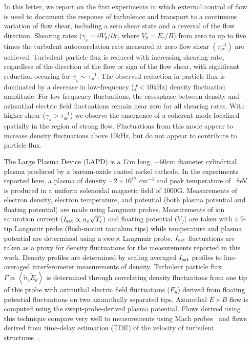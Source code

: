 \documentclass[aps,prl,amsmath,amssymb,preprint,superscriptaddress]{revtex4} %
\begin{document}
In this letter, we report on the first experiments in which external control of flow is used to document the response of turbulence and transport to a continuous variation of flow shear, including a zero shear state and a reversal of the flow direction. Shearing rates ($\gamma_{s}= \partial V_{\theta}/\partial r$, where $V_{\theta} = E_r/B$) from zero to up to five times the turbulent autocorrelation rate measured at zero flow shear $(\tau_{ac}^{-1})$ are achieved. Turbulent particle flux is reduced with increasing shearing rate, regardless of the direction of the flow or sign of the flow shear, with significant reduction occuring for $\gamma_{s} \sim \tau_{ac}^{-1}$.  The observed reduction in particle flux is dominated by a decrease in low-frequency ($f < 10$kHz) density fluctuation amplitude. For low frequency fluctuations, the crossphase between density and azimuthal electric field fluctuations remain near zero for all shearing rates.  With higher shear ($\gamma_{s} > \tau_{ac}^{-1}$) we observe the emergence of a coherent mode localized spatially in the region of strong flow. Fluctuations from this mode appear to increase density fluctuations above 10kHz, but do not appear to contribute to particle flux.   

The Large Plasma Device \cite{gek91} (LAPD) is a 17m long, $\sim$60cm diameter cylindrical plasma produced by a barium-oxide coated nickel
cathode. In the experiments reported here, a plasma of density $\sim$$2 \times 10^{12}$ cm$^{-3}$ and peak temperature of ~8eV is
produced in a uniform solenoidal magnetic field of 1000G.  Measurements of electron density, electron temperature, and potential (both plasma
potential and floating potential) are made using Langmuir probes.  
Measurements of ion saturation current ($I_{\rm sat} \propto n_e \sqrt{T_e}$) and floating
potential ($V_f$) are taken with a 9-tip Langmuir probe (flush-mount
tantalum tips) while temperature and plasma potential are
determined using a swept Langmuir probe. $I_{\rm sat}$ fluctuations are taken as a proxy for density fluctuations for the measurements reported in this work. Density profiles are determined by scaling averaged $I_{\rm sat}$ profiles to line-averaged interferometer measurements of density.  Turbulent particle flux
$\Gamma \propto \left<\tilde{n}_e \tilde{E}_\theta\right>$ is
determined through correlating density fluctuations from one tip
of this probe with
azimuthal electric field fluctuations ($E_\theta$) derived from
floating potential fluctuations on two azimuthally separated tips.
Azimuthal $E\times B$ flow is computed
using the swept-probe-derived plasma potential.  Flows derived using
this technique compare very well to measurements using
Mach probes~\cite{maggs07} and flows derived from time-delay
estimation (TDE) of the velocity of turbulent structures~\cite{holland04}.
  
\end{document}
